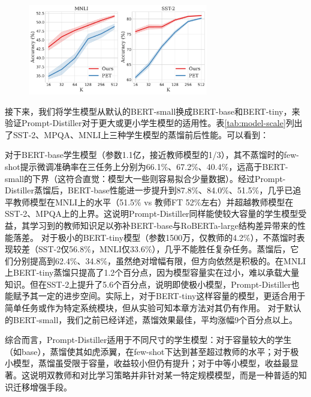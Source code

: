 \documentclass[../main.tex]{subfiles}
\begin{document}
\begin{figure}[htbp]
	\centering
	\includegraphics[width=0.7\textwidth]{plot.pdf}
	\label{fig:datasize}
\end{figure}


接下来，我们将学生模型从默认的BERT-small换成BERT-base和BERT-tiny，来验证Prompt-Distiller对于更大或更小学生模型的适用性。表\ref{tab:model-scale}列出了SST-2、MPQA、MNLI上三种学生模型的蒸馏前后性能。可以看到：

对于BERT-base学生模型（参数1.1亿，接近教师模型的1/3），其不蒸馏时的few-shot提示微调准确率在三任务上分别为66.1\%、67.2\%、40.4\%，远高于BERT-small的下界（这符合直觉：模型大一些则容易拟合少量数据）。经过Prompt-Distiller蒸馏后，BERT-base性能进一步提升到87.8\%、84.0\%、51.5\%，几乎已追平教师模型在MNLI上的水平（51.5\% vs 教师FT 52\%左右）并超越教师模型在SST-2、MPQA上的上界。这说明Prompt-Distiller同样能使较大容量的学生模型受益，其学习到的教师知识足以弥补BERT-base与RoBERTa-large结构差异带来的性能落差。
对于极小的BERT-tiny模型（参数1500万，仅教师的4.2\%），不蒸馏时表现较差（SST-2仅56.8\%，MNLI仅33.6\%），几乎不能胜任复杂任务。蒸馏后，它们分别提高到62.4\%、34.8\%，虽然绝对增幅有限，但方向依然是积极的。在MNLI上BERT-tiny蒸馏只提高了1.2个百分点，因为模型容量实在过小，难以承载大量知识。但在SST-2上提升了5.6个百分点，说明即使极小模型，Prompt-Distiller也能赋予其一定的进步空间。实际上，对于BERT-tiny这样容量的模型，更适合用于简单任务或作为特定系统模块，但从实验可知本章方法对其仍有作用。
对于默认的BERT-small，我们之前已经详述，蒸馏效果最佳，平均涨幅9个百分点以上。

综合而言，Prompt-Distiller适用于不同尺寸的学生模型：对于容量较大的学生（如base），蒸馏使其如虎添翼，在few-shot下达到甚至超过教师的水平；对于极小模型，蒸馏虽受限于容量，收益较小但仍有提升；对于中等小模型，收益最显著。这说明双教师和对比学习策略并非针对某一特定规模模型，而是一种普适的知识迁移增强手段。
\end{document}
